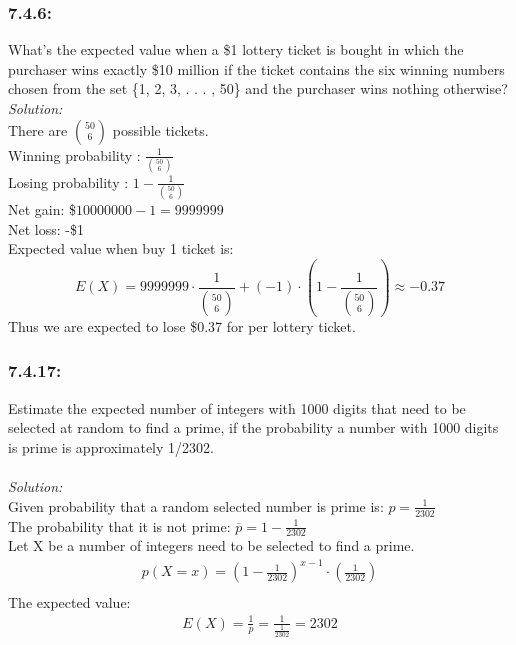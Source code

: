 \documentclass[a4paper]{article}
\begin{document}
\subsubsection*{7.4.6:}
What’s the expected value when a \$1 lottery
ticket is bought in which the purchaser wins exactly
\$10 million if the ticket contains the six winning
numbers chosen from the set \{1, 2, 3, . . . , 50\} and
the purchaser wins nothing otherwise?\\
\textit{Solution:}\\
There are ${50\choose6}$ possible tickets.\\
Winning probability : $\frac{1}{{50\choose6}}$\\
Losing probability : $ 1 - \frac{1}{{50\choose6}}$\\
Net gain: \$$10000000-1=9999999$\\
	Net loss: -\$1\\
	Expected value when buy 1 ticket is:
	\begin{equation*}
		E(X) = 9999999\cdot\frac{1}{{50\choose6}}+(-1)\cdot(1 - \frac{1}{{50\choose6}}) \approx -0.37
	\end{equation*}
	Thus we are expected to lose \$0.37 for per lottery ticket.
	\subsubsection*{7.4.17:}
	Estimate the expected number of integers with 1000 digits that need to be selected at random to find a prime, if the probability a number with 1000 digits is prime is approximately 1/2302. \\ \\
	\textit{Solution:} \\
	Given probability that a random selected number is prime is: $p = \frac{1}{2302}$\\
	The probability that it is not prime: $\overline{p} = 1 - \frac{1}{2302}$ \\
	Let X be a number of integers need to be selected to find a prime. \\ 
	\begin{align*}
		p(X = x ) = (1 - \frac{1}{2302})^{x-1}\cdot(\frac{1}{2302}) \\ 
	\end{align*}
	The expected value: \\
	\begin{align*}
		E(X) = \frac{1}{p} = \frac{1}{\frac{1}{2302}} = 2302  
	\end{align*}
	
\end{document}
